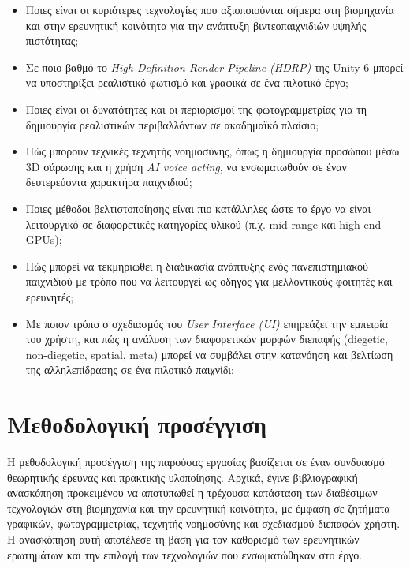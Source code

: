\begin{itemize}
  \item Ποιες είναι οι κυριότερες τεχνολογίες που αξιοποιούνται σήμερα
  στη βιομηχανία και στην ερευνητική κοινότητα για την ανάπτυξη
  βιντεοπαιχνιδιών υψηλής πιστότητας;
  \item Σε ποιο βαθμό το \textit{High Definition Render Pipeline (HDRP)}
  της Unity 6 μπορεί να υποστηρίξει ρεαλιστικό φωτισμό και γραφικά σε
  ένα πιλοτικό έργο;
  \item Ποιες είναι οι δυνατότητες και οι περιορισμοί της φωτογραμμετρίας
  για τη δημιουργία ρεαλιστικών περιβαλλόντων σε ακαδημαϊκό πλαίσιο;
  \item Πώς μπορούν τεχνικές τεχνητής νοημοσύνης, όπως η δημιουργία
  προσώπου μέσω 3D σάρωσης και η χρήση \textit{AI voice acting}, να
  ενσωματωθούν σε έναν δευτερεύοντα χαρακτήρα παιχνιδιού;
  \item Ποιες μέθοδοι βελτιστοποίησης είναι πιο κατάλληλες ώστε το έργο
  να είναι λειτουργικό σε διαφορετικές κατηγορίες υλικού (π.χ. mid-range
  και high-end GPUs);
  \item Πώς μπορεί να τεκμηριωθεί η διαδικασία ανάπτυξης ενός
  πανεπιστημιακού παιχνιδιού με τρόπο που να λειτουργεί ως οδηγός για
  μελλοντικούς φοιτητές και ερευνητές;
  \item Με ποιον τρόπο ο σχεδιασμός του \textit{User Interface (UI)}
  επηρεάζει την εμπειρία του χρήστη, και πώς η ανάλυση των διαφορετικών
  μορφών διεπαφής (diegetic, non-diegetic, spatial, meta) μπορεί να
  συμβάλει στην κατανόηση και βελτίωση της αλληλεπίδρασης σε ένα πιλοτικό
  παιχνίδι;
\end{itemize}
\section{Μεθοδολογική προσέγγιση}
Η μεθοδολογική προσέγγιση της παρούσας εργασίας βασίζεται σε έναν
συνδυασμό θεωρητικής έρευνας και πρακτικής υλοποίησης. Αρχικά, έγινε
βιβλιογραφική ανασκόπηση προκειμένου να αποτυπωθεί η τρέχουσα κατάσταση
των διαθέσιμων τεχνολογιών στη βιομηχανία και την ερευνητική κοινότητα,
με έμφαση σε ζητήματα γραφικών, φωτογραμμετρίας, τεχνητής νοημοσύνης και
σχεδιασμού διεπαφών χρήστη. Η ανασκόπηση αυτή αποτέλεσε τη βάση για τον
καθορισμό των ερευνητικών ερωτημάτων και την επιλογή των τεχνολογιών που
ενσωματώθηκαν στο έργο.

